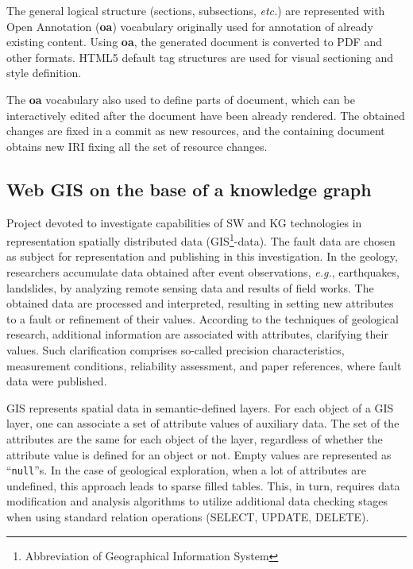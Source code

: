 \documentclass[
]{ceurart}
\begin{document}
The general logical structure (sections, subsections, \emph{etc.}) are represented with Open Annotation (\textbf{oa}) vocabulary originally used for annotation of already existing content. Using \textbf{oa}, the generated document is converted to PDF and other formats.  HTML5 default tag structures are used for visual sectioning and style definition.

The \textbf{oa} vocabulary also used to define parts of document, which can be interactively edited after the document have been already rendered.  The obtained changes are fixed in a commit as new resources, and the containing document obtains new IRI fixing all the set of resource changes.

\subsection{Web GIS on the base of a knowledge graph}
\label{sec:gis-impl}

Project \cite{gisviewer} devoted to investigate capabilities of SW and KG technologies in representation spatially distributed data (GIS\footnote{Abbreviation of Geographical Information System}-data).  The fault data \cite{lunina} are chosen as subject for representation and publishing in this investigation.  In the geology, researchers accumulate data obtained after event observations, \emph{e.g.}, earthquakes, landslides, by analyzing remote sensing data and results of field works.  The obtained data are processed and interpreted, resulting in setting new attributes to a fault or refinement of their values.  According to the techniques of geological research, additional information are associated with attributes, clarifying their values.  Such clarification comprises so-called precision characteristics, measurement conditions, reliability assessment, and paper references, where fault data were published.

GIS represents spatial data in semantic-defined layers.  For each object of a GIS layer, one can associate a set of attribute values of auxiliary data.  The set of the attributes are the same for each object of the layer, regardless of whether the attribute value is defined for an object or not.  Empty values are represented as ``\texttt{null}''s.  In the case of geological exploration, when a lot of attributes are undefined, this approach leads to sparse filled tables.  This, in turn, requires data modification and analysis algorithms to utilize additional data checking stages when using standard relation operations (SELECT, UPDATE, DELETE).
\end{document}
